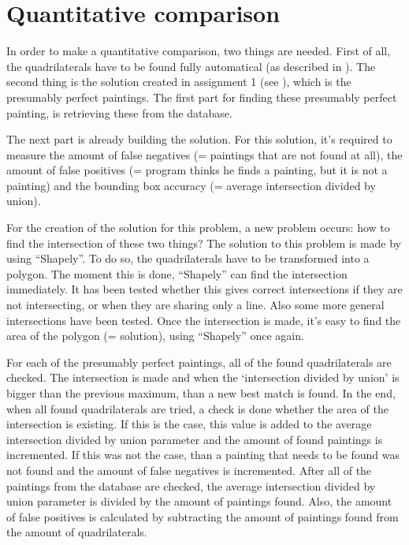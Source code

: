 

\section{Quantitative comparison}
In order to make a quantitative comparison, two things are needed. First of all, the quadrilaterals have to be found fully automatical (as described in ). The second thing is the solution created in assignment 1 (see ), which is the presumably perfect paintings. The first part for finding these presumably perfect painting, is retrieving these from the database. 

The next part is already building the solution. For this solution, it's required to measure the amount of false negatives (= paintings that are not found at all), the amount of false positives (= program thinks he finds a painting, but it is not a painting) and the bounding box accuracy (= average intersection divided by union).

For the creation of the solution for this problem, a new problem occurs: how to find the intersection of these two things? The solution to this problem is made by using ``Shapely''. To do so, the quadrilaterals have to be transformed into a polygon. The moment this is done, ``Shapely'' can find the intersection immediately. It has been tested whether this gives correct intersections if they are not intersecting, or when they are sharing only a line. Also some more general intersections have been tested. Once the intersection is made, it's easy to find the area of the polygon (= solution), using ``Shapely'' once again. 

For each of the presumably perfect paintings, all of the found quadrilaterals are checked. The intersection is made and when the `intersection divided by union' is bigger than the previous maximum, than a new best match is found. In the end, when all found quadrilaterals are tried, a check is done whether the area of the intersection is existing. If this is the case, this value is added to the average intersection divided by union parameter and the amount of found paintings is incremented. If this was not the case, than a painting that needs to be found was not found and the amount of false negatives is incremented. After all of the paintings from the database are checked, the average intersection divided by union parameter is divided by the amount of paintings found. Also, the amount of false positives is calculated by subtracting the amount of paintings found from the amount of quadrilaterals.


